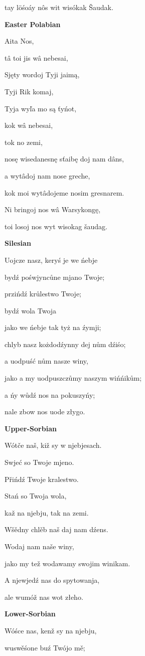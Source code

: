 tay löśoáy nôs wit wisókak Šaudak.

\textbf{Easter Polabian}

Aita Nos,

tâ toi jis wâ nebesai,

Sjęty wordoj Tyji jaimą,

Tyji Rik komaj,

Tyja wyľa mo są ťyńot,

kok wâ nebesai,

tok no zemi,

nosę wisedanesnę sťaibę doj nam dâns,

a wytâdoj nam nose greche,

kok moi wytâdojeme nosim gresnarem.

Ni bringoj nos wâ Warsykongę,

toi losoj nos wyt wisokag šaudag.

\textbf{Silesian}

Uojcze nasz, keryś je we ńebje

bydź pośwjyncůne mjano Twoje;

przińdź krůlestwo Twoje;

bydź wola Twoja

jako we ńebje tak tyż na źymji;

chlyb nasz kożdodźynny dej nům dźiśo;

a uodpuść nům nasze winy,

jako a my uodpuszczůmy naszym wińńikům;

a ńy wůdź nos na pokuszyńy;

nale zbow nos uode złygo.

\textbf{Upper-Sorbian}

Wótče naš, kiž sy w njebjesach.

Swjeć so Twoje mjeno.

Přińdź Twoje kralestwo.

Stań so Twoja wola,

kaž na njebju, tak na zemi.

Wšědny chlěb naš daj nam dźens.

Wodaj nam naše winy,

jako my tež wodawamy swojim winikam.

A njewjedź nas do spytowanja,

ale wumóž nas wot złeho.

\textbf{Lower-Sorbian}

Wóśce nas, kenž sy na njebju,

wuswěśone buź Twójo mě;

